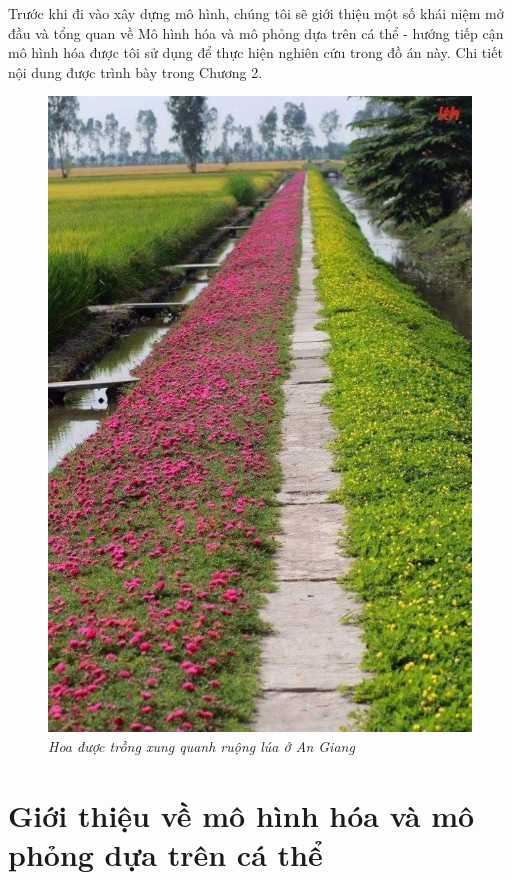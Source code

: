 \documentclass[13pt]{extreport}
\begin{document}
Trước khi đi vào xây dựng mô hình, chúng tôi sẽ giới thiệu một số khái niệm mở đầu và tổng quan về Mô hình hóa và mô phỏng dựa trên cá thể - hướng tiếp cận mô hình hóa được tôi sử dụng để thực hiện nghiên cứu trong đồ án này. Chi tiết nội dung được trình bày trong Chương 2.
\begin{figure}
\begin{center}
\includegraphics[scale=0.5]{photo1}
\end{center}
\caption{\textit{ Hoa được trồng xung quanh ruộng lúa ở An Giang}}
\end{figure}

\newpage
\chapter{Giới thiệu về mô hình hóa và mô phỏng dựa trên cá thể}
\end{document}
